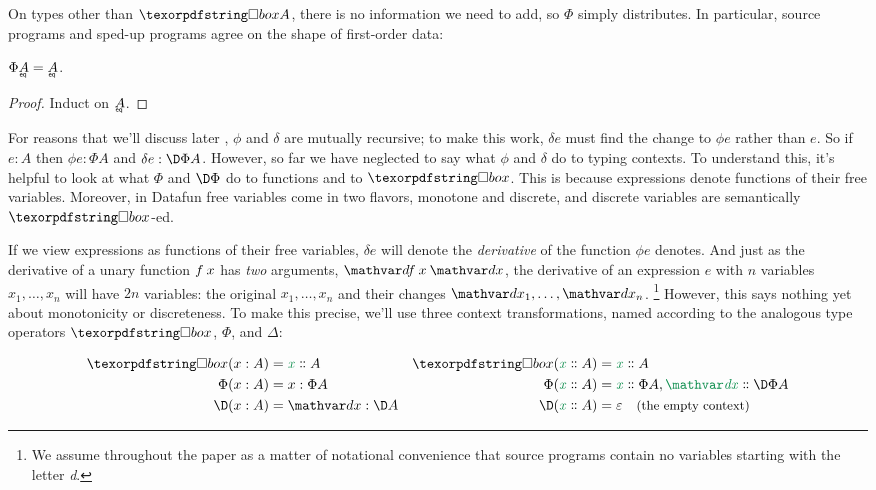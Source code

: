 On types other than $\iso A$, there is no information we need to add, so $\Phi$
simply distributes.
%
In particular, source programs and sped-up programs agree on the shape of
first-order data:

\begin{lemma}\label{thm:phi-eqt}
  $\Phi\eqt A = \eqt A$.
\end{lemma}
\begin{proof}
  Induct on $\eqt A$.
\end{proof}

For reasons that we'll discuss later , $\phi$ and $\delta$ are
mutually recursive; to make this work, $\delta e$ must find the change to $\phi
e$ rather than $e$.
%
So if $e : A$ then $\phi e : \Phi A$ and $\delta e : \DP A$.
%
However, so far we have neglected to say what $\phi$ and $\delta$ do to typing
contexts.
%
To understand this, it's helpful to look at what $\Phi$ and $\DP$ do to
functions and to $\iso$.
%
This is because expressions denote functions of their free variables.
%
Moreover, in Datafun free variables come in two flavors, monotone and discrete, and discrete variables are semantically $\iso$-ed.

If we view expressions as functions of their free variables, $\delta e$ will
denote the \emph{derivative} of the function $\phi e$ denotes.
%
And just as the derivative of a unary function $f\<x$ has \emph{two} arguments,
$\df\<x\<\dx$, the derivative of an expression $e$ with $n$ variables $x_1,
\dots, x_n$ will have $2n$ variables: the original $x_1, \dots, x_n$ and their
changes $\dx_1, \dots, \dx_n$.%
%
\footnote{We assume throughout the paper as a matter of notational convenience
  that source programs contain no variables starting with the letter \emph{d}.}
%
However, this says nothing yet about monotonicity or discreteness.
%
To make this precise, we'll use three context transformations, named according
to the analogous type operators $\iso$, $\Phi$, and $\Delta$:

\begin{align*}
  \iso{(\h x A)} &= \hd x A & \iso{(\hd x A)} &= \hd x A
  \\
  \Phi(\h x A) &= \h x {\Phi A} & \Phi(\hd x A) &= \hd x {\Phi A}, \hd \dx {\DP A}
  \\
  \D(\h x A) &= \h \dx {\D A}
  & \D(\hd x A) &= \emptycx \quad\text{\small(the empty context)}
\end{align*}

